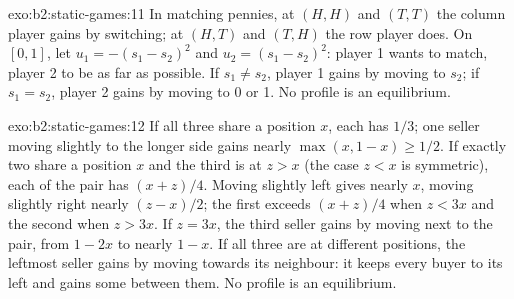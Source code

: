 \begin{solution}{exo:b2:static-games:11}
In matching pennies, at $(H, H)$ and $(T, T)$ the column player gains by switching; at $(H, T)$ and $(T, H)$ the row player
does. On $[0, 1]$, let $u_1 = -(s_1 - s_2)^2$ and $u_2 = (s_1 - s_2)^2$: player 1 wants to match, player 2 to be as far as
possible. If $s_1 \ne s_2$, player 1 gains by moving to $s_2$; if $s_1 = s_2$, player 2 gains by moving to 0 or 1. No profile is
an equilibrium.
\end{solution}

\begin{solution}{exo:b2:static-games:12}
If all three share a position $x$, each has $1/3$; one seller moving slightly to the longer side gains nearly $\max(x,
1 - x) \ge 1/2$. If exactly two share a position $x$ and the third is at $z > x$ (the case $z < x$ is symmetric), each of
the pair has $(x + z)/4$. Moving slightly left gives nearly $x$, moving slightly right nearly $(z - x)/2$; the first exceeds
$(x + z)/4$ when $z < 3x$ and the second when $z > 3x$. If $z = 3x$, the third seller gains by moving next to the pair,
from $1 - 2x$ to nearly $1 - x$. If all three are at different positions, the leftmost seller
gains by moving towards its neighbour: it keeps every buyer to its left and gains some between them. No profile
is an equilibrium.
\end{solution}

